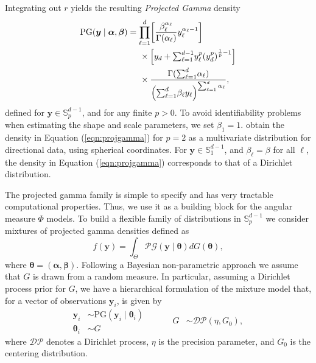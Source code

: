  Integrating out $r$ yields the resulting \emph{Projected Gamma} density
  \begin{equation}
    \label{eqn:projgamma}
    \begin{aligned}
    \text{PG}(\bm{ y}\mid\bm{ \alpha},\bm{ \beta}) &=
          \prod_{\ell = 1}^d\left[\frac{\beta_{\ell}^{\alpha_{\ell}}}{\Gamma(\alpha_{\ell})}
                y_{\ell}^{\alpha_{\ell} - 1}\right]\\
      &\hspace{0.5cm}\times \left[y_d +
          {\textstyle \sum}_{\ell = 1}^{d-1}y_{\ell}^p\left(y_d^p\right)^{\frac{1}{p} - 1}\right]\\
      &\hspace{0.5cm}\times \frac{\Gamma({\textstyle\sum}_{\ell = 1}^d\alpha_{\ell})}{\left({\textstyle\sum}_{\ell = 1}^d
                    \beta_{\ell}y_{\ell}\right)^{{\scriptstyle\sum_{\ell = 1}^d \alpha_{\ell}}}},
    \end{aligned}
  \end{equation}
  defined for $\bm{y}\in {\mathbb S}_p^{d-1}$, and for any finite $p>0$. To avoid identifiability 
  problems when estimating the shape and scale parameters, we set $\beta_1 = 1$.
  \cite{nunez2019} obtain the density in Equation (\ref{eqn:projgamma})
  for $p=2$ as a multivariate distribution for directional data, using spherical coordinates.  
  For $\bm{ y}\in {\mathbb S}_1^{d-1}$, and $\beta_{\ell} = \beta$ for all $\ell$, the density in Equation (\ref{eqn:projgamma}) corresponds to that of a Dirichlet distribution.
  
  
The projected gamma family is simple to specify and has very tractable 
  computational properties. Thus, we use it as a building block for the 
  angular measure $\Phi$ models. To build a flexible family of distributions 
  in ${\mathbb S}_p^{d-1}$ we consider mixtures of projected gamma densities 
  defined as
  \begin{equation} \label{eqn:PGmix}     
     f(\bm{y}) = \int_\Theta \mathcal{PG}(\bm{y}\mid \bm{\theta}) dG(\bm{\theta}), 
  \end{equation} 
where $\bm{\theta} = (\bm{\alpha}, \bm{\beta})$. Following a Bayesian 
  non-parametric approach \citep{Ferguson74,Antoniak1974} we assume that $G$ 
  is drawn from a random measure. In particular, assuming a Dirichlet process 
  prior for $G$, we have a hierarchical formulation of the mixture model that, 
  for a vector of observations $\bm{y}_i$, is given by
  \begin{equation}\label{eqn:dppg}
    \begin{aligned}
    \bm{y}_i &\sim \text{PG}(\bm{y}_i\mid \bm{\theta}_i)\\
    \bm{\theta}_i &\sim G
    \end{aligned}
    ~\hspace{1cm}
    \begin{aligned}
    G &\sim \mathcal{DP}(\eta, G_0),
    \end{aligned}
  \end{equation}
  where $\mathcal{DP}$ denotes a Dirichlet process, $\eta$ is the precision 
  parameter, and $G_0$ is the centering distribution. 
  
